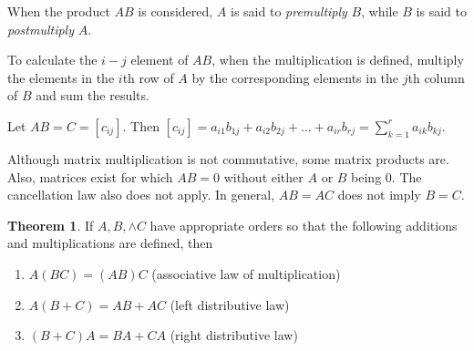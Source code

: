 \documentclass[11pt]{article}
\theoremstyle{definition}
\newtheorem{theorem}{Theorem}
\begin{document}
		When the product $AB$ is considered, $A$ is said to \textit{premultiply} $B$, while $B$ is said to \textit{postmultiply} $A$.
		
		To calculate the $i-j$ element of $AB$, when the multiplication is defined, multiply the elements in the $i$th row of $A$ by the corresponding elements in the $j$th column of $B$ and sum the results.
		
		Let $AB = C = [c_{ij}]$. Then $[c_{ij}] = a_{i1}b_{1j} + a_{i2}b_{2j} + \dots + a_{ir}b_{rj} = \sum\limits_{k=1}^{r} a_{ik}b_{kj}$.
		
		Although matrix multiplication is not commutative, some matrix products are. Also, matrices exist for which $AB = 0$ without either $A$ or $B$ being $0$. The cancellation law also does not apply. In general, $AB = AC$ does not imply $B = C$.	
		
		\begin{theorem}
			If $A, B, \land C$ have appropriate orders so that the following additions and multiplications are defined, then
			\begin{enumerate}[label=(\alph*)]
				\item $A(BC) = (AB) C$ \hfill (associative law of multiplication)
				\item $A(B+C) = AB + AC$ \hfill (left distributive law)
				\item $(B+C)A = BA + CA$ \hfill (right distributive law)
			\end{enumerate}
		\end{theorem}
		
\end{document}
